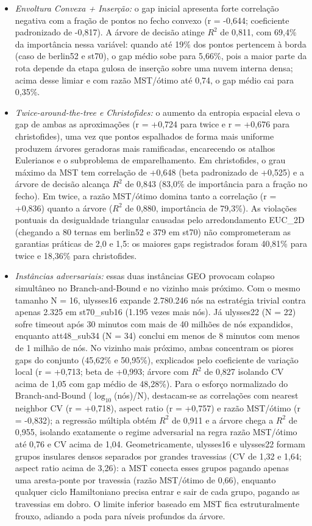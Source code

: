 \documentclass[12pt]{article}
\begin{document}
\begin{itemize}
  \item \textit{Envoltura Convexa + Inserção:} o gap inicial apresenta forte correlação negativa com a fração de pontos no fecho convexo (r = -0,644; coeficiente padronizado de -0,817). A árvore de decisão atinge $R^2$ de 0,811, com 69,4\% da importância nessa variável: quando até 19\% dos pontos pertencem à borda (caso de berlin52 e st70), o gap médio sobe para 5,66\%, pois a maior parte da rota depende da etapa gulosa de inserção sobre uma nuvem interna densa; acima desse limiar e com razão MST/ótimo até 0,74, o gap médio cai para 0,35\%.
  \item \textit{Twice-around-the-tree e Christofides:} o aumento da entropia espacial eleva o gap de ambas as aproximações (r = +0,724 para twice e r = +0,676 para christofides), uma vez que pontos espalhados de forma mais uniforme produzem árvores geradoras mais ramificadas, encarecendo os atalhos Eulerianos e o subproblema de emparelhamento. Em christofides, o grau máximo da MST tem correlação de +0,648 (beta padronizado de +0,525) e a árvore de decisão alcança $R^2$ de 0,843 (83,0\% de importância para a fração no fecho). Em twice, a razão MST/ótimo domina tanto a correlação (r = +0,836) quanto a árvore ($R^2$ de 0,880, importância de 79,3\%). As violações pontuais da desigualdade triangular causadas pelo arredondamento EUC\_2D (chegando a 80 ternas em berlin52 e 379 em st70) não comprometeram as garantias práticas de 2,0 e 1,5: os maiores gaps registrados foram 40,81\% para twice e 18,36\% para christofides.
  \item \textit{Instâncias adversariais:} essas duas instâncias GEO provocam colapso simultâneo no Branch-and-Bound e no vizinho mais próximo. Com o mesmo tamanho N = 16, ulysses16 expande 2.780.246 nós na estratégia trivial contra apenas 2.325 em st70\_sub16 (1.195 vezes mais nós). Já ulysses22 (N = 22) sofre timeout após 30 minutos com mais de 40 milhões de nós expandidos, enquanto att48\_sub34 (N = 34) conclui em menos de 8 minutos com menos de 1 milhão de nós. No vizinho mais próximo, ambas concentram os piores gaps do conjunto (45,62\% e 50,95\%), explicados pelo coeficiente de variação local (r = +0,713; beta de +0,993; árvore com $R^2$ de 0,827 isolando CV acima de 1,05 com gap médio de 48,28\%). Para o esforço normalizado do Branch-and-Bound ($\log_{10}$(nós)/N), destacam-se as correlações com nearest neighbor CV (r = +0,718), aspect ratio (r = +0,757) e razão MST/ótimo (r = -0,832); a regressão múltipla obtém $R^2$ de 0,911 e a árvore chega a $R^2$ de 0,955, isolando exatamente o regime adversarial na regra razão MST/ótimo até 0,76 e CV acima de 1,04. Geometricamente, ulysses16 e ulysses22 formam grupos insulares densos separados por grandes travessias (CV de 1,32 e 1,64; aspect ratio acima de 3,26): a MST conecta esses grupos pagando apenas uma aresta-ponte por travessia (razão MST/ótimo de 0,66), enquanto qualquer ciclo Hamiltoniano precisa entrar e sair de cada grupo, pagando as travessias em dobro. O limite inferior baseado em MST fica estruturalmente frouxo, adiando a poda para níveis profundos da árvore.
\end{itemize}
\end{document}
